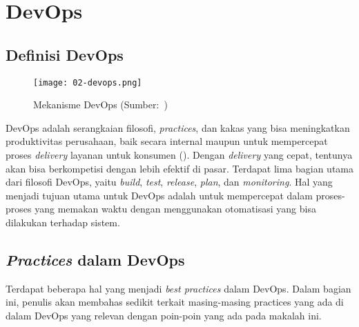 \section{DevOps}

\subsection{Definisi DevOps}
\begin{figure}[h]
  \centering
  \texttt{[image: 02-devops.png]}
  \caption{Mekanisme DevOps (Sumber:~\cite{devops})}
\end{figure}
DevOps adalah serangkaian filosofi, \textit{practices}, dan kakas yang bisa meningkatkan produktivitas perusahaan, baik secara internal maupun untuk mempercepat proses \textit{delivery} layanan untuk konsumen (\cite{devops}).
Dengan \textit{delivery} yang cepat, tentunya akan bisa berkompetisi dengan lebih efektif di pasar.
Terdapat lima bagian utama dari filosofi DevOps, yaitu \textit{build}, \textit{test}, \textit{release}, \textit{plan}, dan \textit{monitoring}.
Hal yang menjadi tujuan utama untuk DevOps adalah untuk mempercepat dalam proses-proses yang memakan waktu dengan menggunakan otomatisasi yang bisa dilakukan terhadap sistem.

\subsection{\textit{Practices} dalam DevOps}
Terdapat beberapa hal yang menjadi \textit{best practices} dalam DevOps. 
Dalam bagian ini, penulis akan membahas sedikit terkait masing-masing practices yang ada di dalam DevOps yang relevan dengan poin-poin yang ada pada makalah ini.

